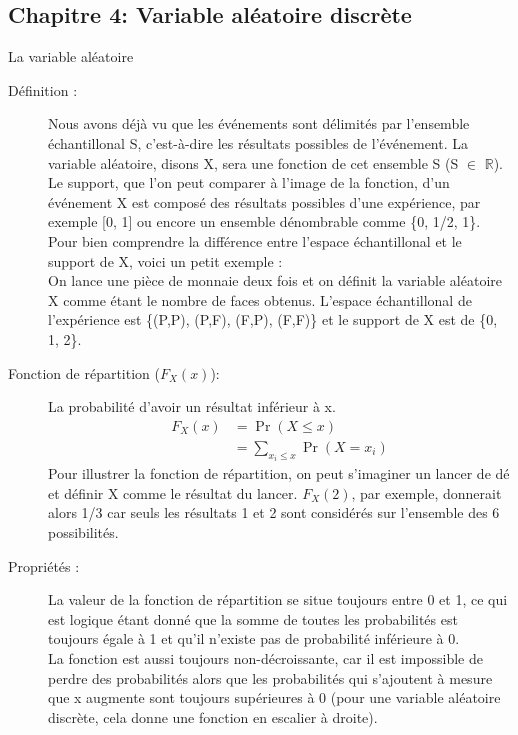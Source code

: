 \documentclass[10pt, french]{article}
\begin{document}
\begin{multicols*}{3}
\section{Chapitre 4: Variable aléatoire discrète}
\begin{probch4}{La variable aléatoire}
  \begin{description}
    \item[Définition :] Nous avons déjà vu que les événements sont délimités par l'ensemble échantillonal S, c'est-à-dire les résultats possibles de l'événement. La variable aléatoire, disons X, sera une fonction de cet ensemble S (S $\in$ $\mathbb{R}$).\\
    Le support, que l'on peut comparer à l'image de la fonction, d'un événement X est composé des résultats possibles d'une expérience, par exemple [0, 1] ou encore un ensemble dénombrable comme \{0, 1/2, 1\}.\\
    Pour bien comprendre la différence entre l'espace échantillonal et le support de X, voici un petit exemple : \\
    On lance une pièce de monnaie deux fois et on définit la variable aléatoire X comme étant le nombre de faces obtenus. L'espace échantillonal de l'expérience est \{(P,P), (P,F), (F,P), (F,F)\} et le support de X est de \{0, 1, 2\}.
    \item[Fonction de répartition ($F_{X} (x)$):] La probabilité d'avoir un résultat inférieur à x.
    \begin{align*}
    F_{X} (x) &= \Pr(X \le x) \\
    &= \sum_{x_{i} \le x}^{} \Pr(X = x_{i})
    \end{align*}
    Pour illustrer la fonction de répartition, on peut s'imaginer un lancer de dé et définir X comme le résultat du lancer. $F_{X} (2)$, par exemple, donnerait alors 1/3 car seuls les résultats 1 et 2 sont considérés sur l'ensemble des 6 possibilités. 
    \item[Propriétés :] La valeur de la fonction de répartition se situe toujours entre 0 et 1, ce qui est logique étant donné que la somme de toutes les probabilités est toujours égale à 1 et qu'il n'existe pas de probabilité inférieure à 0. \\
    La fonction est aussi toujours non-décroissante, car il est impossible de perdre des probabilités alors que les probabilités qui s'ajoutent à mesure que x augmente sont toujours supérieures à 0 (pour une variable aléatoire discrète, cela donne une fonction en escalier à droite).\\

\end{description}
\end{probch4}
\end{multicols*}
\end{document}
